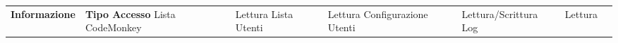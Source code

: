 \begin{center}
    \phantom{M}%


    \begin{tabularx}
        {\textwidth} {|X|X|}
        \hline  {}
        \n      {}
        \large \textbf{Informazione}  & \centering\large\textbf{Tipo Accesso}
        \n      Lista CodeMonkey      & Lettura
        \n      Lista Utenti          & Lettura
        \n      Configurazione Utenti & Lettura/Scrittura
        \n      Log                   & Lettura
        \n
    \end{tabularx}\label{tab:monkeytable:problema:tabellaRuoloInformazioni:Amministratore}
\end{center}
